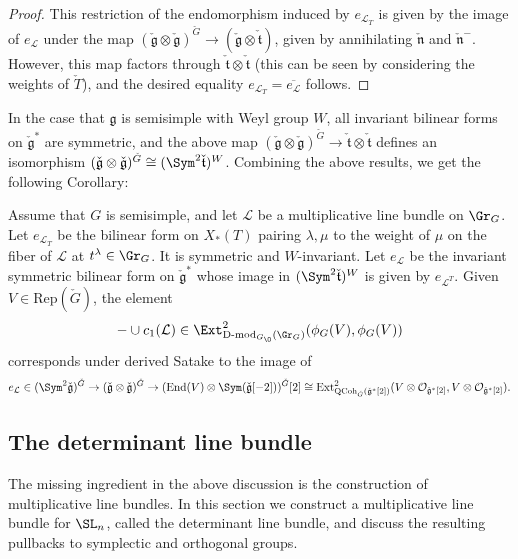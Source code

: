 \documentclass[11pt]{article}
\begin{document}
\begin{appendices}
\begin{proof}
    This restriction of the endomorphism induced by $e_{\mathcal{L}_T}$ is given by the image of $e_\mathcal{L}$ under the map $(\check{\mathfrak{g}}\otimes \check{\mathfrak{g}})^{\check{G}}\to (\check{\mathfrak{g}}\otimes \check{\mathfrak{t}})$, given by annihilating $\check{\mathfrak{n}}$ and $\check{\mathfrak{n}}^-$. However, this map factors through $\check{\mathfrak{t}}\otimes \check{\mathfrak{t}}$ (this can be seen by considering the weights of $\check{T}$), and the desired equality $e_{\mathcal{L}_T} = \overline{e_\mathcal{L}}$ follows.
\end{proof}
In the case that $\mathfrak{g}$ is semisimple with Weyl group $W$, all invariant bilinear forms on $\check{\mathfrak{g}}^*$ are symmetric, and the above map $(\check{\mathfrak{g}}\otimes \check{\mathfrak{g}})^{\check{G}}\to \check{\mathfrak{t}}\otimes \check{\mathfrak{t}}$ defines an isomorphism $(\check{\mathfrak{g}}\otimes \check{\mathfrak{g}})^{\check{G}}\cong (\Sym^2\check{\mathfrak{t}})^{W}$.
Combining the above results, we get the following Corollary:
\begin{corollary}\label{cor: derived Satake of canonical endomorphism}
    Assume that $G$ is semisimple, and let $\mathcal{L}$ be a multiplicative line bundle on $\Gr_G$. Let $e_{\mathcal{L}_T}$ be the bilinear form on $X_*(T)$ pairing $\lambda,\mu$ to the weight of $\mu$ on the fiber of $\mathcal{L}$ at $t^\lambda\in \Gr_G$. It is symmetric and $W$-invariant.
    Let $e_\mathcal{L}$ be the invariant symmetric bilinear form on $\check{\mathfrak{g}}^*$ whose image in $(\Sym^2\check{\mathfrak{t}})^{W}$ is given by $e_{\mathcal{L}^T}$. Given $V\in\mathrm{Rep}(\check{G})$, the element $$-\cup c_1(\mathcal{L})\in \Ext^2_{\operatorname{D-mod}_{G_\O}(\Gr_G)}(\phi_G(V), \phi_G(V))$$ corresponds under derived Satake to the image of $$e_\mathcal{L}\in (\Sym^2\check{\mathfrak{g}})^{\check{G}}\to (\check{\mathfrak{g}}\otimes \check{\mathfrak{g}})^{\check{G}}\to (\mathrm{End}(V)\otimes \Sym(\check{\mathfrak{g}}[-2]))^{\check{G}}[2]\cong \mathrm{Ext}^2_{\mathrm{QCoh}_{\check{G}}(\check{\mathfrak{g}}^*[2])}(V\otimes \mathcal{O}_{\check{\mathfrak{g}}^*[2]}, V\otimes \mathcal{O}_{\check{\mathfrak{g}}^*[2]}).$$
\end{corollary}

\subsection{The determinant line bundle}\label{appendix: det line bundle}
The missing ingredient in the above discussion is the construction of multiplicative line bundles. In this section we construct a multiplicative line bundle for $\SL_n$, called the determinant line bundle, and discuss the resulting pullbacks to symplectic and orthogonal groups.


\end{appendices}
\end{document}
